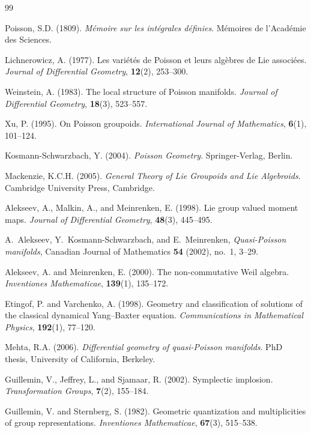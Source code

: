 \documentclass[reqno]{amsart}
\theoremstyle{plain}
\theoremstyle{definition}
\begin{document}
\begin{thebibliography}{99}

Poisson, S.D. (1809). 
\textit{Mémoire sur les intégrales définies}. 
Mémoires de l'Académie des Sciences.

Lichnerowicz, A. (1977). 
Les variétés de Poisson et leurs algèbres de Lie associées. 
\textit{Journal of Differential Geometry}, \textbf{12}(2), 253--300.

Weinstein, A. (1983). 
The local structure of Poisson manifolds. 
\textit{Journal of Differential Geometry}, \textbf{18}(3), 523--557.

Xu, P. (1995).
On Poisson groupoids.
\textit{International Journal of Mathematics}, \textbf{6}(1), 101--124.

Kosmann-Schwarzbach, Y. (2004). 
\textit{Poisson Geometry}. 
Springer-Verlag, Berlin.

Mackenzie, K.C.H. (2005). 
\textit{General Theory of Lie Groupoids and Lie Algebroids}. 
Cambridge University Press, Cambridge.

Alekseev, A., Malkin, A., and Meinrenken, E. (1998). 
Lie group valued moment maps. 
\textit{Journal of Differential Geometry}, \textbf{48}(3), 445--495.

A.~Alekseev, Y.~Kosmann-Schwarzbach, and E.~Meinrenken,
\textit{Quasi-Poisson manifolds},
Canadian Journal of Mathematics \textbf{54} (2002), no.~1, 3--29.

Alekseev, A. and Meinrenken, E. (2000). 
The non-commutative Weil algebra. 
\textit{Inventiones Mathematicae}, \textbf{139}(1), 135--172.

Etingof, P. and Varchenko, A. (1998).
Geometry and classification of solutions of the classical dynamical Yang--Baxter equation.
\textit{Communications in Mathematical Physics}, \textbf{192}(1), 77--120.

Mehta, R.A. (2006). 
\textit{Differential geometry of quasi-Poisson manifolds}. 
PhD thesis, University of California, Berkeley.

Guillemin, V., Jeffrey, L., and Sjamaar, R. (2002). 
Symplectic implosion. 
\textit{Transformation Groups}, \textbf{7}(2), 155--184.

Guillemin, V. and Sternberg, S. (1982).
Geometric quantization and multiplicities of group representations.
\textit{Inventiones Mathematicae}, \textbf{67}(3), 515--538.


\end{thebibliography}
\end{document}
